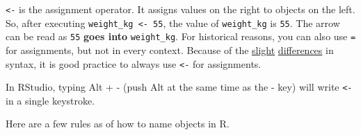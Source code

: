 \documentclass[]{book}
\theoremstyle{definition}
\theoremstyle{definition}
\theoremstyle{remark}
\begin{document}
\texttt{\textless{}-} is the assignment operator. It assigns values on
the right to objects on the left. So, after executing
\texttt{weight\_kg\ \textless{}-\ 55}, the value of \texttt{weight\_kg}
is \texttt{55}. The arrow can be read as \texttt{55} \textbf{goes into}
\texttt{weight\_kg}. For historical reasons, you can also use \texttt{=}
for assignments, but not in every context. Because of the
\href{http://blog.revolutionanalytics.com/2008/12/use-equals-or-arrow-for-assignment.html}{slight}
\href{https://web.archive.org/web/20130610005305/https://stat.ethz.ch/pipermail/r-help/2009-March/191462.html}{differences}
in syntax, it is good practice to always use \texttt{\textless{}-} for
assignments.

In RStudio, typing Alt + - (push Alt at the same time as the - key) will
write \texttt{\textless{}-} in a single keystroke.

Here are a few rules as of how to name objects in R.
\end{document}
